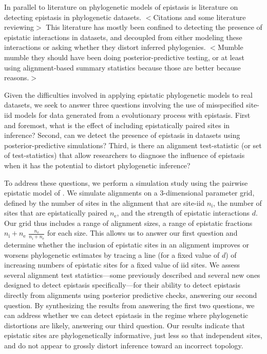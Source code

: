 \documentclass[11pt]{article}
\newcommand{\amcomment}[1]{{\color{blue}{(\textbf{AM's comment:} #1)}}}
\begin{document}
In parallel to literature on phylogenetic models of epistasis is literature on detecting epistasis in phylogenetic datasets.
$<$Citations and some literature reviewing$>$
This literature has mostly been confined to detecting the presence of epistatic interactions in datasets, and decoupled from either modeling these interactions or asking whether they distort inferred phylogenies.
$<$Mumble mumble they should have been doing posterior-predictive testing, or at least using alignment-based summary statistics because those are better because reasons.$>$

Given the difficulties involved in applying epistatic phylogenetic models to real datasets, we seek to answer three questions involving the use of misspecified site-iid models for data generated from a evolutionary process with epistasis.
First and foremost, what is the effect of including epistatically paired sites in inference?
Second, can we detect the presence of epistasis in datasets using posterior-predictive simulations?
Third, is there an alignment test-statistic (or set of test-statistics) that allow researchers to diagnose the influence of epistasis when it has the potential to distort phylogenetic inference?

To address these questions, we perform a simulation study using the pairwise epistatic model of \cite{nasrallah2013phylogenetic}.
We simulate alignments on a 3-dimensional parameter grid, defined by the number of sites in the alignment that are site-iid $n_{\mathrm{i}}$, the number of sites that are epistatically paired $n_{\mathrm{e}}$, and the strength of epistatic interactions $d$.
Our grid thus includes a range of alignment sizes, a range of epistatic fractions $n_{\mathrm{i}}+n_{\mathrm{e}}$ $\frac{n_{\mathrm{e}}}{n_{\mathrm{i}}+n_{\mathrm{e}}}$ for each size.
This allows us to answer our first question and determine whether the inclusion of epistatic sites in an alignment improves or worsens phylogenetic estimates by tracing a line (for a fixed value of $d$) of increasing numbers of epistatic sites for a fixed value of iid sites.
We assess several alignment test statistics---some previously described and several new ones designed to detect epistasis specifically---for their ability to detect epistasis directly from alignments using posterior predictive checks, answering our second question.
By synthesizing the results from answering the first two questions, we can address whether we can detect epistasis in the regime where phylogenetic distortions are likely, answering our third question.
Our results indicate that epistatic sites are phylogenetically informative, just less so that independent sites, and do not appear to grossly distort inference toward an incorrect topology.
\end{document}
